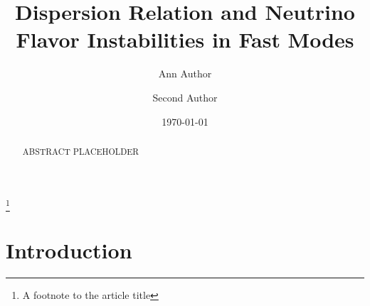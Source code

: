 \documentclass[%
 reprint,
 amsmath,amssymb,
 aps,
 prd
]{revtex4-1}
\begin{document}

\title{Dispersion Relation and Neutrino Flavor Instabilities in Fast Modes}%
\thanks{A footnote to the article title}%

\author{Ann Author}
\author{Second Author}%
%


\date{\today}%

\begin{abstract}

ABSTRACT PLACEHOLDER


\end{abstract}

\maketitle




\section{\label{sec-introduction}Introduction}
\end{document}
